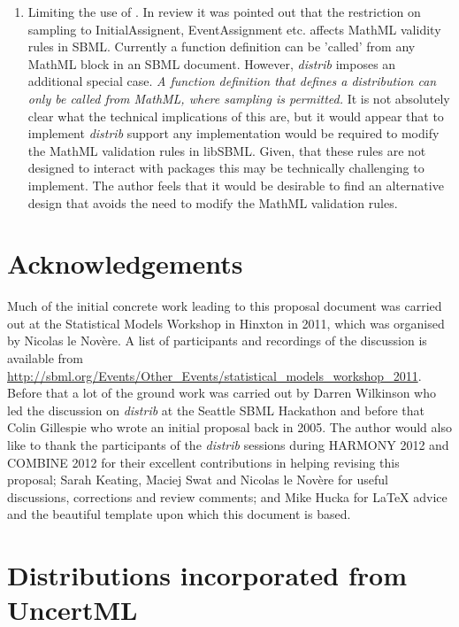 \documentclass[draftspec]{sbmlpkgspec}
\newcommand{\distribshort}{\emph{distrib}\xspace}
\newcommand{\mathml}{MathML\xspace}
\newcommand{\uncertml}{UncertML\xspace}
\begin{document}
\begin{enumerate}
\item Limiting the use of . In review it was
  pointed out that the restriction on sampling to InitialAssignent,
  EventAssignment etc. affects MathML validity rules in SBML. Currently
  a function definition can be 'called' from any \mathml block in an
  SBML document. However, \distribshort imposes an additional special
  case. \emph{A function definition that defines a distribution can
    only be called from \mathml, where sampling is permitted.} It is
  not absolutely clear what the technical implications of this are,
  but it would appear that to implement \distribshort support any
  implementation would be required to modify the \mathml validation
  rules in libSBML. Given, that these rules are not designed to
  interact with packages this may be technically challenging to
  implement. The author feels that it would be desirable to find an
  alternative design that avoids the need to modify the \mathml
  validation rules.
\end{enumerate}

\section{Acknowledgements}
\label{sec:acknowledgements}

Much of the initial concrete work leading to this proposal document
was carried out at the Statistical Models Workshop in Hinxton in 2011,
which was organised by Nicolas le Nov\`{e}re. A list of participants
and recordings of the discussion is available from
\url{http://sbml.org/Events/Other_Events/statistical_models_workshop_2011}.
Before that a lot of the ground work was carried out by Darren
Wilkinson who led the discussion on \distribshort at the Seattle SBML
Hackathon and before that Colin Gillespie who wrote an initial
proposal back in 2005. The author would also like to thank the
participants of the \distribshort sessions during HARMONY 2012 and
COMBINE 2012 for their excellent contributions in helping revising
this proposal; Sarah Keating, Maciej Swat and Nicolas le Nov\`{e}re
for useful discussions, corrections and review comments; and Mike
Hucka for \LaTeX{} advice and the beautiful template upon which this
document is based.

\appendix
\section{Distributions incorporated from \uncertml}
\label{sec:uncertmlusage}
\end{document}
